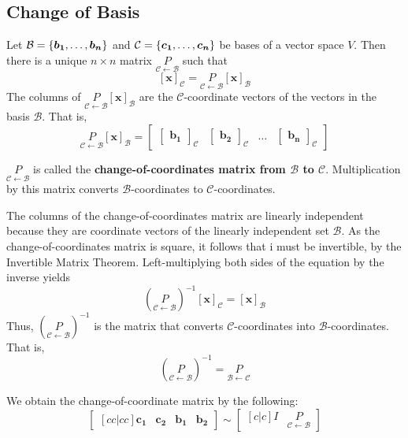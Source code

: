 \documentclass[11pt]{scrartcl}
\theoremstyle{dotlessP}
\theoremstyle{dotlessN}
\DeclarePairedDelimiter\set{\{}{\}}
\newcommand{\basis}{\mathcal{B}}
\begin{document}
\subsection{Change of Basis}
\begin{theorem}
	Let $\basis = \set*{\bm{b_1}, \dots, \bm{b_n}}$ and $\mathcal{C} = \set*{\bm{c_1}, \dots, \bm{c_n}}$ be bases of a vector space $V$. Then there is a unique $n \times n$ matrix $\underset{\mathcal{C} \leftarrow \basis}{P}$ such that
	\[
		[\bm{x}]_\mathcal{C} = \underset{\mathcal{C} \leftarrow \basis}{P}[\bm{x}]_\basis
	\] 
	The columns of $\underset{\mathcal{C} \leftarrow \basis}{P}[\bm{x}]_\basis$ are the $\mathcal{C}$-coordinate vectors of the vectors in the basis $\basis$. That is,
\[
\underset{\mathcal{C} \leftarrow \basis}{P}[\bm{x}]_\basis = 
\begin{bmatrix}
	\begin{bmatrix}
		\bm{b_1}
	\end{bmatrix}_\mathcal{C} & 	\begin{bmatrix}
		\bm{b_2}
\end{bmatrix}_\mathcal{C} & \dots & \begin{bmatrix}
		\bm{b_n}
	\end{bmatrix}_\mathcal{C}
\end{bmatrix}
\] 
\end{theorem}
\begin{definition}
	$\underset{\mathcal{C} \leftarrow \basis}{P}$ is called the \textbf{change-of-coordinates matrix from $\bm{\basis}$ to  $\bm{\mathcal{C}}$}. Multiplication by this matrix converts $\basis$-coordinates to $\mathcal{C}$-coordinates.
\end{definition}
\begin{remark}
	The columns of the change-of-coordinates matrix are linearly independent because they are coordinate vectors of the linearly independent set $\basis$. As the change-of-coordinates matrix is square, it follows that i must be invertible, by the Invertible Matrix Theorem. Left-multiplying both sides of the equation by the inverse yields
	 \[
		 (\underset{\mathcal{C} \leftarrow \basis}{P})^{-1}[\bm{x}]_\mathcal{C} = [\bm{x}]_\basis
	\] 
	Thus, $(\underset{\mathcal{C} \leftarrow \basis}{P})^{-1}$ is the matrix that converts $\mathcal{C}$-coordinates into $\basis $-coordinates. That is,
	\[
	(\underset{\mathcal{C} \leftarrow \basis}{P})^{-1} = \underset{\basis \leftarrow \mathcal{C}}{P}
	\] 
\end{remark}
We obtain the change-of-coordinate matrix by the following:
\[
	\begin{bmatrix}[cc|cc]
		\bm{c_1} & \bm{c_2} & \bm{b_1} & \bm{b_2}
\end{bmatrix} \sim
\begin{bmatrix}[c|c]
	I & \underset{\mathcal{C} \leftarrow \basis}{P}
\end{bmatrix}
\] 
\end{document}
